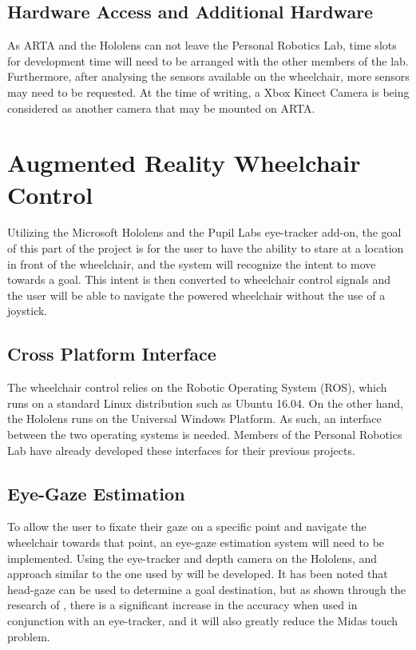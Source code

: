 \documentclass[12pt,a4paper]{report}
\begin{document}
\subsection{Hardware Access and Additional Hardware}
As ARTA and the Hololens can not leave the Personal Robotics Lab, time slots for development time will need to be arranged with the other members of the lab. Furthermore, after analysing the sensors available on the wheelchair, more sensors may need to be requested. At the time of writing, a Xbox Kinect Camera is being considered as another camera that may be mounted on ARTA.


\section{Augmented Reality Wheelchair Control} \label{section:ARWC}
Utilizing the Microsoft Hololens and the Pupil Labs eye-tracker add-on, the goal of this part of the project is for the user to have the ability to stare at a location in front of the wheelchair, and the system will recognize the intent to move towards a goal. This intent is then converted to wheelchair control signals and the user will be able to navigate the powered wheelchair without the use of a joystick.

\subsection{Cross Platform Interface}
The wheelchair control relies on the Robotic Operating System (ROS), which runs on a standard Linux distribution such as Ubuntu 16.04. On the other hand, the Hololens runs on the Universal Windows Platform. As such, an interface between the two operating systems is needed. Members of the Personal Robotics Lab have already developed these interfaces for their previous projects.

\subsection{Eye-Gaze Estimation}
To allow the user to fixate their gaze on a specific point and navigate the wheelchair towards that point, an eye-gaze estimation system will need to be implemented. Using the eye-tracker and depth camera on the Hololens, and approach similar to the one used by \cite{Raymond2018} will be developed. It has been noted that head-gaze can be used to determine a goal destination, but as shown through the research of \cite{VanderMeulen2017}, there is a significant increase in the accuracy when used in conjunction with an eye-tracker, and it will also greatly reduce the Midas touch problem.
\end{document}
